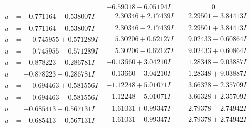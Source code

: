 \documentclass[1p]{elsarticle_modified}
\theoremstyle{definition}
\begin{document}
$$\begin{array}{c|c|c}
 & -6.59018 - 6.05194 I & \phantom{-0.000000 } 0 \\ \hline\begin{aligned}
u &= -0.771164 + 0.538007 I\end{aligned}
 & \phantom{-}2.30346 + 2.17439 I & \phantom{-}2.29501 - 3.84413 I \\ \hline\begin{aligned}
u &= -0.771164 - 0.538007 I\end{aligned}
 & \phantom{-}2.30346 - 2.17439 I & \phantom{-}2.29501 + 3.84413 I \\ \hline\begin{aligned}
u &= \phantom{-}0.745955 + 0.571289 I\end{aligned}
 & \phantom{-}5.30206 + 0.62127 I & \phantom{-}9.02433 - 0.60864 I \\ \hline\begin{aligned}
u &= \phantom{-}0.745955 - 0.571289 I\end{aligned}
 & \phantom{-}5.30206 - 0.62127 I & \phantom{-}9.02433 + 0.60864 I \\ \hline\begin{aligned}
u &= -0.878223 + 0.286781 I\end{aligned}
 & -0.13660 + 3.04210 I & \phantom{-}1.28348 - 9.03887 I \\ \hline\begin{aligned}
u &= -0.878223 - 0.286781 I\end{aligned}
 & -0.13660 - 3.04210 I & \phantom{-}1.28348 + 9.03887 I \\ \hline\begin{aligned}
u &= \phantom{-}0.694463 + 0.581556 I\end{aligned}
 & -1.12248 + 5.01071 I & \phantom{-}3.66328 - 2.35709 I \\ \hline\begin{aligned}
u &= \phantom{-}0.694463 - 0.581556 I\end{aligned}
 & -1.12248 - 5.01071 I & \phantom{-}3.66328 + 2.35709 I \\ \hline\begin{aligned}
u &= -0.685413 + 0.567131 I\end{aligned}
 & -1.61031 + 0.99347 I & \phantom{-}2.79378 - 2.74942 I \\ \hline\begin{aligned}
u &= -0.685413 - 0.567131 I\end{aligned}
 & -1.61031 - 0.99347 I & \phantom{-}2.79378 + 2.74942 I \\ \hline\begin{aligned}

\end{aligned}
\end{array}$$
\end{document}
